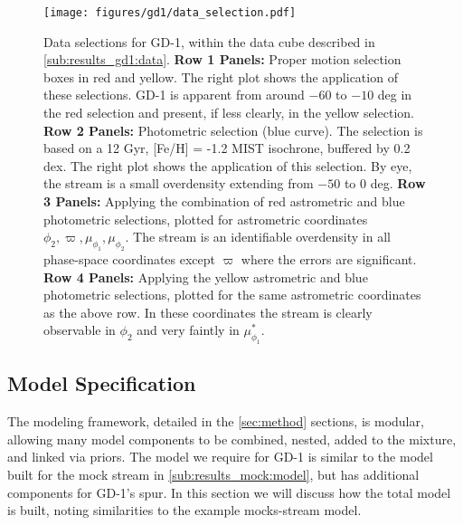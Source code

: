 \documentclass[twocolumn]{aastex631}
\newcommand{\stream}[1]{#1}
\newcommand{\parallax}{\varpi}
\begin{document}
        \begin{figure*}[h]
            \centering
            \texttt{[image: figures/gd1/data\_selection.pdf]}
            \caption{%
                Data selections for \stream{GD-1}, within the data cube
                described in \autoref{sub:results_gd1:data}.
                \textbf{Row 1 Panels:}
                Proper motion selection boxes in red and yellow.  The right plot
                shows the application of these selections.  \stream{GD-1} is
                apparent from around $-60$ to $-10$ deg in the red selection and
                present, if less clearly, in the yellow selection.
                \textbf{Row 2 Panels:}
                Photometric selection (blue curve). The selection is based on a
                12 Gyr, [Fe/H] = -1.2 MIST isochrone, buffered by 0.2 dex.  The
                right plot shows the application of this selection. By eye, the
                stream is a small overdensity extending from $-50$ to $0$ deg.
                \textbf{Row 3 Panels:}
                Applying the combination of red astrometric and blue photometric
                selections, plotted for astrometric coordinates $\phi_2, \parallax,
                \mu_{\phi_1}, \mu_{\phi_2}$.  The stream is an identifiable
                overdensity in all phase-space coordinates except $\parallax$ where
                the errors are significant.
                \textbf{Row 4 Panels:}
                Applying the yellow astrometric and blue photometric selections,
                plotted for the same astrometric coordinates as the above row.
                In these coordinates the stream is clearly observable in
                $\phi_2$ and very faintly in $\mu_{\phi_1}^*$.  }
            \label{fig:gd1-data_selection}
        \end{figure*}
        

    \subsection{Model Specification}\label{sub:results_gd1:model}

        The modeling framework, detailed in the \autoref{sec:method} sections, is
        modular, allowing many model components to be combined, nested, added
        to the mixture, and linked via priors.
        The model we require for \stream{GD-1} is similar to 
        the model built for the mock stream in \autoref{sub:results_mock:model},
        but has additional components for \stream{GD-1}'s spur.
        In this section we will discuss how the total model is built, noting 
        similarities to the example mocks-stream model.
\end{document}
